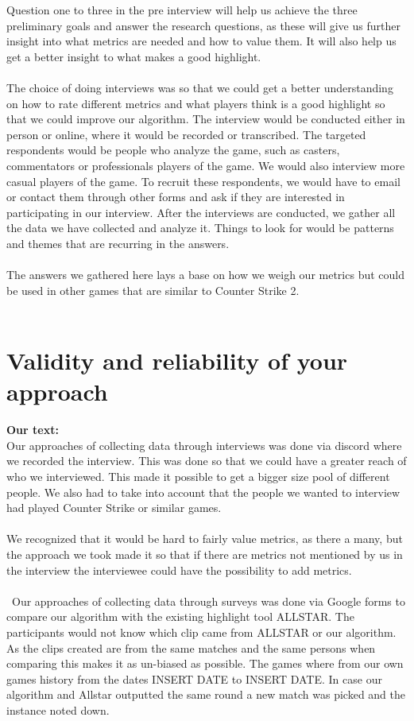 Question one to three in the pre interview will help us achieve the three preliminary goals and answer the research questions, as these will give us further insight into what metrics are needed and how to value them. It will also help us get a better insight to what makes a good highlight. \\\\
The choice of doing interviews was so that we could get a better understanding on how to rate different metrics and what players think is a good highlight so that we could improve our algorithm. The interview would be conducted either in person or online, where it would be recorded or transcribed. The targeted respondents would be people who analyze the game, such as casters, commentators or professionals players of the game. We would also interview more casual players of the game. To recruit these respondents, we would have to email or contact them through other forms and ask if they are interested in participating in our interview. After the interviews are conducted, we gather all the data we have collected and analyze it. Things to look for would be patterns and themes that are recurring in the answers.\\\\
The answers we gathered here lays a base on how we weigh our metrics but could be used in other games that are similar to Counter Strike 2.\\\\ 


\section{Validity and reliability of your approach}
\textbf{Our text:}\\
Our approaches of collecting data through interviews was done via discord where we recorded the interview. This was done so that we could have a greater reach of who we interviewed. This made it possible to get a bigger size pool of different people. We also had to take into account that the people we wanted to interview had played Counter Strike or similar games.\\\\ We recognized that it would be hard to fairly value metrics, as there a many, but the approach we took made it so that if there are metrics not mentioned by us in the interview the interviewee could have the possibility to add metrics.   \\\\\
Our approaches of collecting data through surveys was done via Google forms to compare our algorithm with the existing highlight tool ALLSTAR. The participants would not know which clip came from ALLSTAR or our algorithm. As the clips created are from the same matches and the same persons when comparing this makes it as un-biased as possible. The games where from our own games history from the dates {INSERT DATE} to {INSERT DATE}. In case our algorithm and Allstar outputted the same round a new match was picked and the instance noted down. 